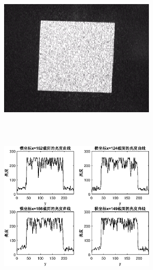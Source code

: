 \documentclass[UTF8]{ctexart}
\makeatletter
\newcommand{\figcaption}{\def\@captype{figure}\caption}
\makeatother
\begin{document}
\begin{center}
			\includegraphics[width=7.5cm,height=7.5cm]{YUANaddDOEangel2.eps}
			\includegraphics[width=7.5cm,height=7.5cm]{addDOEangel2.eps}
			\figcaption{加DOE的CCD捕捉图和光亮度曲线(角度2)}\label{addDOEangel2}
			

\end{center}
\end{document}
